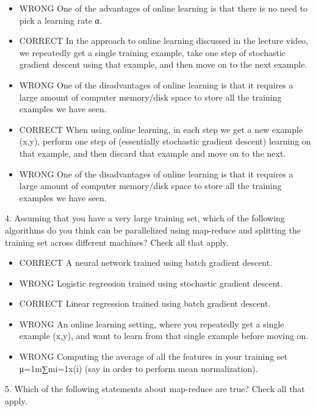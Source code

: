 \documentclass[11pt]{article} %
\begin{document}
 \begin{itemize}

\item WRONG One of the advantages of online learning is that there is no need to pick a learning rate α.

\item CORRECT In the approach to online learning discussed in the lecture video, we repeatedly get a single training example, take one step of stochastic gradient descent using that example, and then move on to the next example.

\item WRONG One of the disadvantages of online learning is that it requires a large amount of computer memory/disk space to store all the training examples we have seen.

\item CORRECT When using online learning, in each step we get a new example (x,y), perform one step of (essentially stochastic gradient descent) learning on that example, and then discard that example and move on to the next.

\item WRONG One of the disadvantages of online learning is that it requires a large amount of computer memory/disk space to store all the training examples we have seen.

\end{itemize}
4. 
Assuming that you have a very large training set, which of the following algorithms do you think can be parallelized using map-reduce and splitting the training set across different machines? Check all that apply.


\begin{itemize}

\item CORRECT A neural network trained using batch gradient descent.

\item WRONG Logistic regression trained using stochastic gradient descent.

\item CORRECT Linear regression trained using batch gradient descent.

\item WRONG An online learning setting, where you repeatedly get a single example (x,y), and want to learn from that single example before moving on.

\item WRONG Computing the average of all the features in your training set μ=1m∑mi=1x(i) (say in order to perform mean normalization).

\end{itemize}
5. 
Which of the following statements about map-reduce are true? Check all that apply.
\end{document}

